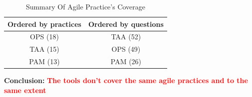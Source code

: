 \clearpage

\begin{table}
\centering
	\begin{tabular}{| c | c |} \hline
		\textbf{Ordered by practices} & \textbf{Ordered by questions} \\ \hline
		OPS (18) & TAA (52) \\ \hline
		TAA (15) & OPS (49) \\ \hline
		PAM (13) & PAM (26) \\ \hline
	\end{tabular}
	\caption{Summary Of Agile Practice's Coverage}
	\label{table:agile_practices_coverage_summary}
\end{table}

\textbf{Conclusion:} \textcolor{red}{\textbf{The tools don't cover the same agile practices and to the same extent}} \\

\clearpage